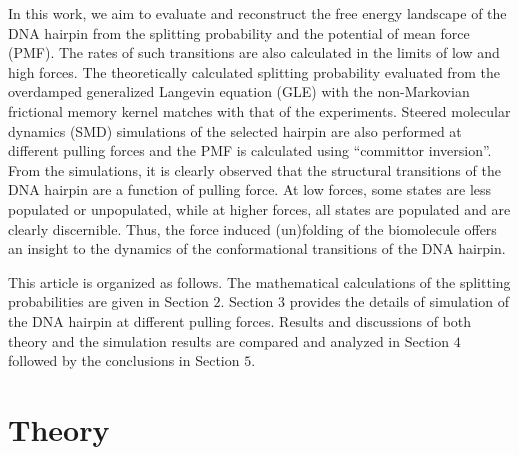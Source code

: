 \documentclass[twoside,twocolumn,9pt]{article}
\begin{document}
In this work, we aim to evaluate and reconstruct the free energy landscape of
the DNA hairpin from the splitting probability and the potential of mean force (PMF). 
The rates of such transitions are also calculated in the limits of low and high forces. 
The theoretically calculated splitting 
probability evaluated from the overdamped generalized Langevin equation (GLE) with the non-Markovian frictional memory 
kernel matches with that of the experiments. Steered molecular dynamics (SMD) simulations of 
the selected hairpin are also performed at different pulling forces and the PMF is calculated using ``committor 
inversion''. From the simulations, it is clearly observed that the structural transitions of the DNA 
hairpin are a function of pulling force. At low forces, some states are less populated or unpopulated, 
while at higher forces, all states are populated and are clearly discernible. Thus, the force induced 
(un)folding of the biomolecule offers an insight to the dynamics of the conformational transitions 
of the DNA hairpin. 

This article is organized as follows. The mathematical calculations 
of the splitting probabilities are given in Section $2$. Section $3$ provides the details of simulation 
of the DNA hairpin at different pulling forces. Results and discussions of both theory and 
the simulation results are compared and analyzed in Section $4$ followed by the conclusions in Section $5$.

\section{Theory} \label{theory}
\end{document}
